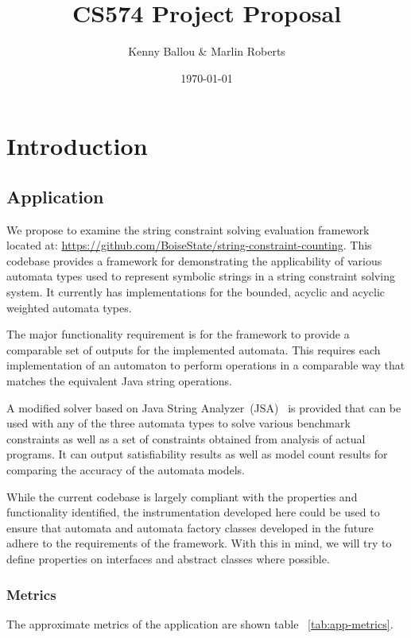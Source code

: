 \documentclass[letterpaper,11pt]{article}
\title{CS574 Project Proposal}
\date{\today}
\author{Kenny Ballou \& Marlin Roberts}
\begin{document}
\maketitle{}
\tableofcontents{}

\section{Introduction}

\subsection{Application}

We propose to examine the string constraint solving evaluation framework
located at: \url{https://github.com/BoiseState/string-constraint-counting}.
This codebase provides a framework for demonstrating the applicability of
various automata types used to represent symbolic strings in a string
constraint solving system.  It currently has implementations for the bounded,
acyclic and acyclic weighted automata types.

The major functionality requirement is for the framework to provide a
comparable set of outputs for the implemented automata.  This requires each
implementation of an automaton to perform operations in a comparable way that
matches the equivalent Java string operations.

A modified solver based on Java String Analyzer~(JSA)~\cite{strings2003} is
provided that can be used with any of the three automata types to solve various
benchmark constraints as well as a set of constraints obtained from analysis of
actual programs.  It can output satisfiability results as well as model count
results for comparing the accuracy of the automata models.

While the current codebase is largely compliant with the properties and
functionality identified, the instrumentation developed here could be used to
ensure that automata and automata factory classes developed in the future
adhere to the requirements of the framework.  With this in mind, we will try to
define properties on interfaces and abstract classes where possible.

\subsubsection{Metrics}

The approximate metrics of the application are shown table
~\ref{tab:app-metrics}.
\end{document}

